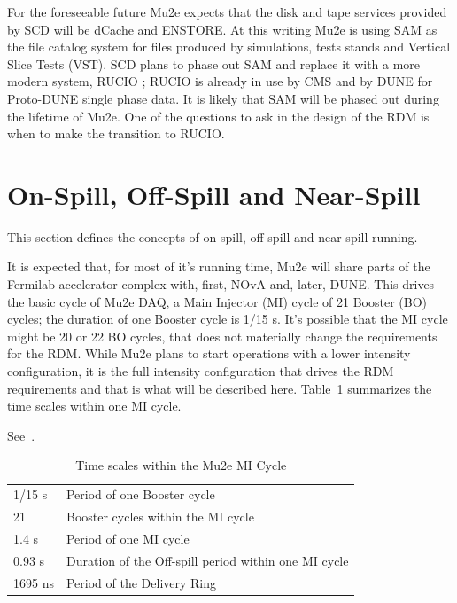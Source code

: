 For the foreseeable future Mu2e expects that the disk and tape services provided
by SCD will be dCache and ENSTORE.
At this writing Mu2e is using SAM as the file catalog system for files produced
by simulations, tests stands and Vertical Slice Tests (VST).
SCD plans to phase out SAM and replace it with a more modern system, RUCIO ;
RUCIO is already in use by CMS and by DUNE for Proto-DUNE single phase data.
It is likely that SAM will be phased out during the lifetime of Mu2e.
One of the questions to ask in the design of the RDM is
when to make the transition to RUCIO.

\section{On-Spill, Off-Spill and Near-Spill}

This section defines the concepts of on-spill, off-spill and near-spill running.

It is expected that, for most of it's running time, Mu2e will share parts
of the Fermilab accelerator complex with, first, NOvA and, later, DUNE.
This drives the basic cycle of Mu2e DAQ, a Main Injector (MI) cycle of
21 Booster (BO) cycles; the duration of one Booster cycle is 1/15 s.
It's possible that the MI cycle might be 20 or 22 BO cycles, that does
not materially change the requirements for the RDM.
While Mu2e plans to start operations with a lower intensity configuration,
it is the full intensity configuration that drives the RDM requirements and that
is what will be described here.  Table~\ref{tab:timescales} summarizes the
time scales within one MI cycle.

See~\cite{beamTiming}. 

\begin{table}
\begin{center}
\caption[Time scales within the Mu2e MI Cycle]{Time scales within the Mu2e MI Cycle}
\label{tab:timescales}
\begin{tabular}{ll}\hline
   1/15 s & Period of one Booster cycle \\
   21     & Booster cycles within the MI cycle \\
   1.4 s  & Period of one MI cycle \\
   0.93 s & Duration of the Off-spill period within one MI cycle \\
  1695 ns & Period of the Delivery Ring \\
  \end{tabular}
\end{center}
\end{table}



